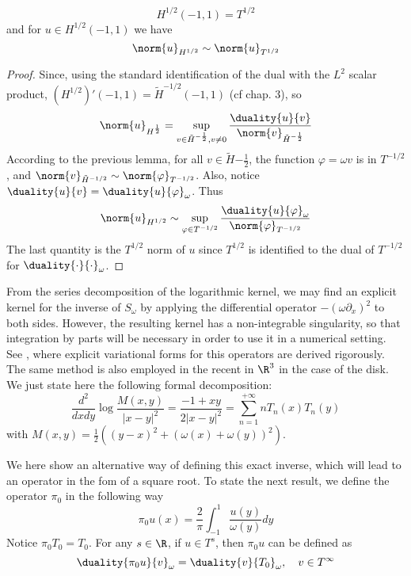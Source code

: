 \documentclass[]{article}
\begin{document}
\begin{Lem}
	\[H^{1/2}(-1,1) = T^{1/2}\]
	and for $u \in H^{1/2}(-1,1)$ we have
	\[\norm{u}_{H^{1/2}} \sim \norm{u}_{T^{1/2}}\]
	\begin{proof}
		Since, using the standard identification of the dual with the $L^2$ scalar product, $(H^{1/2})'(-1,1) =  \tilde{H}^{-1/2}(-1,1)$ (cf \cite{mclean1986spectral} chap. 3), so
		\[\norm{u}_{H^{\frac{1}{2}}} = \sup_{v\in \tilde{H}^{-\frac{1}{2}}, v\neq 0} \dfrac{\duality{u}{v}}{\norm{v}_{\tilde{H}^{-\frac{1}{2}}}}\]
		According to the previous lemma, for all $v\in \tilde{H}{-\frac{1}{2}}$, the function $\varphi = \omega v$ is in $T^{-1/2}$, and $\norm{ v}_{\tilde{H}^{-1/2}} \sim \norm{\varphi}_{T^{-1/2}}$. Also, notice $\duality{u}{v} = \duality{u}{\varphi}_\omega$. Thus 
		\[\norm{u}_{H^{1/2}} \sim \sup_{\varphi \in T^{-1/2}} \dfrac{\duality{u}{\varphi}_\omega}{\norm{\varphi}_{T^{-1/2}}}\]
		The last quantity is the $T^{1/2}$ norm of $u$ since $T^{1/2}$ is identified to the dual of $T^{-1/2}$ for $\duality{\cdot}{\cdot}_\omega$. 
	\end{proof}
\end{Lem}
From the series decomposition of the logarithmic kernel, we may find an explicit kernel for the inverse of $S_\omega$ by applying the differential operator $-(\omega \partial_x)^2$ to both sides. However, the resulting kernel has a non-integrable singularity, so that integration by parts will be necessary in order to use it in a numerical setting. See \cite{jerez2011variational,urzua2014optimal}, where explicit variational forms for this operators are derived rigorously. The same method is also employed in the recent \cite{hiptmair2017closed} in $\R^3$ in the case of the disk. We just state here the following formal decomposition:
\[\dfrac{d^2}{dxdy}\log\frac{M(x,y)}{|x-y|^2} = \frac{-1+xy}{2|x-y|^2} = \sum_{n=1}^{+ \infty} n T_n(x)T_n(y)\]
with 
$M(x,y) = \frac{1}{2}\left((y-x)^2 + (\omega(x) + \omega(y))^2\right) $.

We here show an alternative way of defining this exact inverse, which will lead to an operator in the fom of a square root. To state the next result, we define the operator $\pi_{0}$ in the following way 
\[\pi_0 u(x)  = \frac{2}{\pi} \int_{-1}^{1}\frac{u(y)}{\omega(y)}dy\]
Notice $\pi_0 T_0 = T_0$. For any $s \in \R$, if $u \in T^s$, then $\pi_0 u$ can be defined as
\[\duality{\pi_0 u}{v}_{\omega} = \duality{v}{T_0}_{\omega}, \quad v\in T^{\infty}\]  
\end{document}
